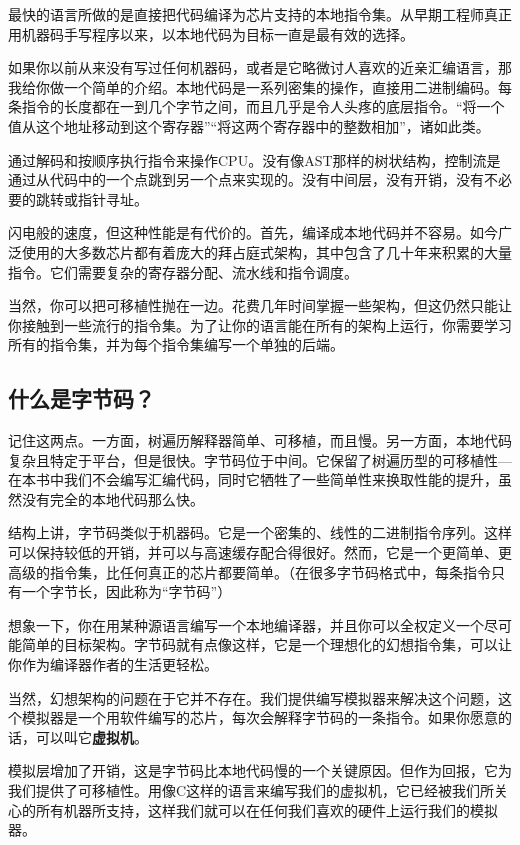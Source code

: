 \documentclass[cn,11pt,chinese]{elegantbook}
\begin{document}
最快的语言所做的是直接把代码编译为芯片支持的本地指令集。从早期工程师真正用机器码手写程序以来，以本地代码为目标一直是最有效的选择。

如果你以前从来没有写过任何机器码，或者是它略微讨人喜欢的近亲汇编语言，那我给你做一个简单的介绍。本地代码是一系列密集的操作，直接用二进制编码。每条指令的长度都在一到几个字节之间，而且几乎是令人头疼的底层指令。“将一个值从这个地址移动到这个寄存器”“将这两个寄存器中的整数相加”，诸如此类。

通过解码和按顺序执行指令来操作CPU。没有像AST那样的树状结构，控制流是通过从代码中的一个点跳到另一个点来实现的。没有中间层，没有开销，没有不必要的跳转或指针寻址。

闪电般的速度，但这种性能是有代价的。首先，编译成本地代码并不容易。如今广泛使用的大多数芯片都有着庞大的拜占庭式架构，其中包含了几十年来积累的大量指令。它们需要复杂的寄存器分配、流水线和指令调度。

当然，你可以把可移植性抛在一边。花费几年时间掌握一些架构，但这仍然只能让你接触到一些流行的指令集。为了让你的语言能在所有的架构上运行，你需要学习所有的指令集，并为每个指令集编写一个单独的后端。

\subsection{什么是字节码？}

记住这两点。一方面，树遍历解释器简单、可移植，而且慢。另一方面，本地代码复杂且特定于平台，但是很快。字节码位于中间。它保留了树遍历型的可移植性—在本书中我们不会编写汇编代码，同时它牺牲了一些简单性来换取性能的提升，虽然没有完全的本地代码那么快。

结构上讲，字节码类似于机器码。它是一个密集的、线性的二进制指令序列。这样可以保持较低的开销，并可以与高速缓存配合得很好。然而，它是一个更简单、更高级的指令集，比任何真正的芯片都要简单。（在很多字节码格式中，每条指令只有一个字节长，因此称为“字节码”）

想象一下，你在用某种源语言编写一个本地编译器，并且你可以全权定义一个尽可能简单的目标架构。字节码就有点像这样，它是一个理想化的幻想指令集，可以让你作为编译器作者的生活更轻松。

当然，幻想架构的问题在于它并不存在。我们提供编写模拟器来解决这个问题，这个模拟器是一个用软件编写的芯片，每次会解释字节码的一条指令。如果你愿意的话，可以叫它\textbf{虚拟机}。

模拟层增加了开销，这是字节码比本地代码慢的一个关键原因。但作为回报，它为我们提供了可移植性。用像C这样的语言来编写我们的虚拟机，它已经被我们所关心的所有机器所支持，这样我们就可以在任何我们喜欢的硬件上运行我们的模拟器。
\end{document}
